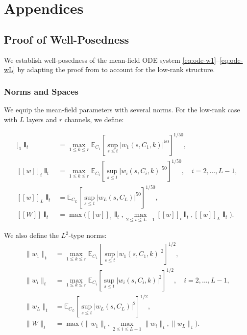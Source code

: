 \documentclass[11pt]{article}
\newcommand{\E}{\mathbb{E}}
\newcommand{\1}{\mathbbm{1}}
\newcommand{\llbracket}{[\![}
\newcommand{\rrbracket}{]\!]}
\newcommand{\interleave}[1]{\llbracket #1 \rrbracket}
\begin{document}
\section{Appendices}

\subsection{Proof of Well-Posedness}
\label{app:wellposed-proof}

We establish well-posedness of the mean-field ODE system \eqref{eq:ode-w1}--\eqref{eq:ode-wL} by adapting the proof from \cite{nguyen2023rigorousframeworkmeanfield} to account for the low-rank structure.

\subsubsection{Norms and Spaces}

We equip the mean-field parameters with several norms. For the low-rank case with $L$ layers and $r$ channels, we define:

\begin{align*}
\interleave w_1\interleave_t &= \max_{1\le k\le r}\E_{C_1}\!\left[\sup_{s\le t}|w_1(s,C_1,k)|^{50}\right]^{1/50},\\
\interleave w_i\interleave_t &= \max_{1\le k\le r}\E_{C_i}\!\left[\sup_{s\le t}|w_i(s,C_i,k)|^{50}\right]^{1/50}, \quad i=2,\ldots,L-1,\\
\interleave w_L\interleave_t &= \E_{C_L}\!\left[\sup_{s\le t}|w_L(s,C_L)|^{50}\right]^{1/50},\\
\interleave W\interleave_t &= \max\big(\interleave w_1\interleave_t, \max_{2\le i\le L-1}\interleave w_i\interleave_t, \interleave w_L\interleave_t\big).
\end{align*}

We also define the $L^2$-type norms:
\begin{align*}
\|w_1\|_t &= \max_{1\le k\le r}\E_{C_1}\!\left[\sup_{s\le t}|w_1(s,C_1,k)|^2\right]^{1/2},\\
\|w_i\|_t &= \max_{1\le k\le r}\E_{C_i}\!\left[\sup_{s\le t}|w_i(s,C_i,k)|^2\right]^{1/2}, \quad i=2,\ldots,L-1,\\
\|w_L\|_t &= \E_{C_L}\!\left[\sup_{s\le t}|w_L(s,C_L)|^2\right]^{1/2},\\
\|W\|_t &= \max\big(\|w_1\|_t, \max_{2\le i\le L-1}\|w_i\|_t, \|w_L\|_t\big).
\end{align*}
\end{document}
